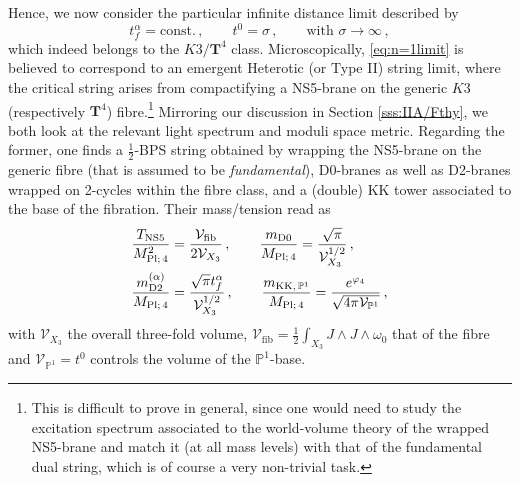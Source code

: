 Hence, we now consider the particular infinite distance limit described by 
%
\begin{equation}\label{eq:n=1limit}
	t_f^{\alpha}  = \text{const.}\, , \qquad t^0= \sigma\, , \qquad \text{with}\, \, \sigma\to \infty\, , 
\end{equation}
%
which indeed belongs to the $K3/\mathbf{T}^4$ class. Microscopically, \eqref{eq:n=1limit} is believed to correspond to an emergent Heterotic (or Type II) string limit, where the critical string arises from compactifying a NS5-brane on the generic $K3$ (respectively $\mathbf{T}^4$) fibre.\footnote{This is difficult to prove in general, since one would need to study the excitation spectrum associated to the world-volume theory of the wrapped NS5-brane and match it (at all mass levels) with that of the fundamental dual string, which is of course a very non-trivial task.} Mirroring our discussion in Section \ref{sss:IIA/Fthy}, we both look at the relevant light spectrum and moduli space metric. Regarding the former, one finds a $\frac{1}{2}$-BPS string obtained by wrapping the NS5-brane on the generic fibre (that is assumed to be \emph{fundamental}), D0-branes as well as D2-branes wrapped on 2-cycles within the fibre class, and a (double) KK tower associated to the base of the fibration. Their mass/tension read as
%
\begin{align}
	\notag \frac{T_{\text{NS5}}}{M_{\text{Pl;}\, 4}^2} &= \frac{\mathcal{V}_{\text{fib}}}{ 2 \mathcal{V}_{X_3}}\, , \qquad \frac{m_{\text{D0}}}{M_{\text{Pl;}\, 4}} = \frac{\sqrt{\pi}}{\mathcal{V}_{X_3}^{1/2}}\, ,\\
	\frac{m_{\text{D2}}^{(\alpha)}}{M_{\text{Pl;}\, 4}} &= \frac{\sqrt{\pi} t_f^{\alpha}}{\mathcal{V}_{X_3}^{1/2}}\, , \qquad \frac{m_{\text{KK}, \, \mathbb{P}^1}}{M_{\text{Pl;}\, 4}} = \frac{e^{\varphi_4}}{\sqrt{4 \pi \mathcal{V}_{\mathbb{P}^1}}}\, ,
\end{align}
%
with $\mathcal{V}_{X_3}$ the overall three-fold volume, $\mathcal{V}_{\text{fib}}= \frac{1}{2} \int_{X_3} J\wedge J \wedge \omega_0$ that of the fibre and $\mathcal{V}_{\mathbb{P}^1} = t^0$ controls the volume of the $\mathbb{P}^1$-base. 
	
